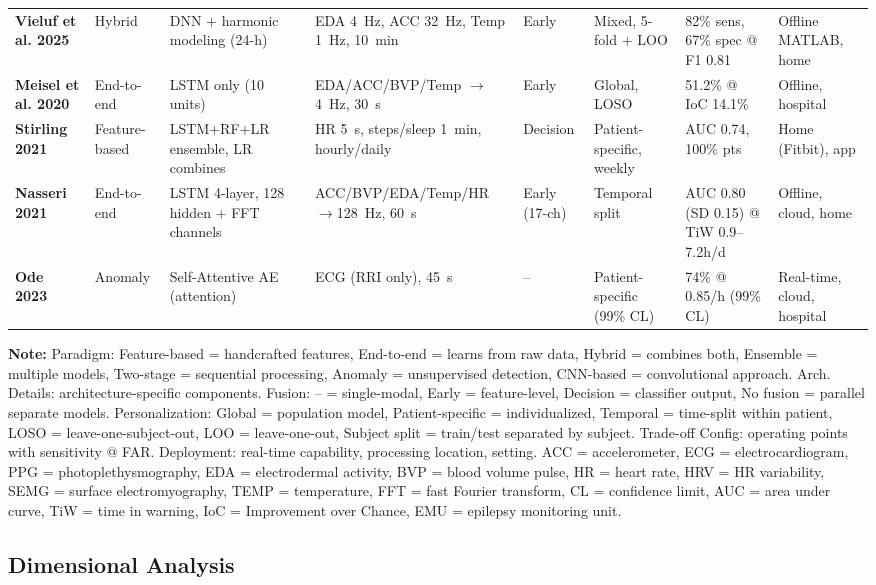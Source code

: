 \begin{landscape}
\begin{table}[htbp]
{\begin{tabular}{@{} l >{\raggedright}p{1.8cm} >{\raggedright}p{2.2cm} >{\raggedright}p{2.0cm} >{\centering}p{1.2cm} >{\raggedright}p{1.8cm} >{\raggedright}p{2.0cm} >{\raggedright}p{1.8cm} @{}}
\textbf{Vieluf et al. 2025} & Hybrid & DNN + harmonic modeling (24-h) & EDA 4~Hz, ACC 32~Hz, Temp 1~Hz, 10~min & Early & Mixed, 5-fold + LOO & 82\% sens, 67\% spec @ F1 0.81 & Offline MATLAB, home \\
\textbf{Meisel et al. 2020} & End-to-end & LSTM only (10 units) & EDA/ACC/BVP/Temp $\to$4~Hz, 30~s & Early & Global, LOSO & 51.2\% @ IoC 14.1\% & Offline, hospital \\
\textbf{Stirling 2021} & Feature-based & LSTM+RF+LR ensemble, LR combines & HR 5~s, steps/sleep 1~min, hourly/daily & Decision & Patient-specific, weekly & AUC 0.74, 100\% pts & Home (Fitbit), app \\
\textbf{Nasseri 2021} & End-to-end & LSTM 4-layer, 128 hidden + FFT channels & ACC/BVP/EDA/Temp/HR $\to$128~Hz, 60~s & Early (17-ch) & Temporal split & AUC 0.80 (SD 0.15) @ TiW 0.9--7.2h/d & Offline, cloud, home \\
\textbf{Ode 2023} & Anomaly & Self-Attentive AE (attention) & ECG (RRI only), 45~s & -- & Patient-specific (99\% CL) & 74\% @ 0.85/h (99\% CL) & Real-time, cloud, hospital \\
\bottomrule
\end{tabular}%
}
\par\medskip
\footnotesize
\textbf{Note:} Paradigm: Feature-based = handcrafted features, End-to-end = learns from raw data, Hybrid = combines both, Ensemble = multiple models, Two-stage = sequential processing, Anomaly = unsupervised detection, CNN-based = convolutional approach. Arch. Details: architecture-specific components. Fusion: -- = single-modal, Early = feature-level, Decision = classifier output, No fusion = parallel separate models. Personalization: Global = population model, Patient-specific = individualized, Temporal = time-split within patient, LOSO = leave-one-subject-out, LOO = leave-one-out, Subject split = train/test separated by subject. Trade-off Config: operating points with sensitivity @ FAR. Deployment: real-time capability, processing location, setting. ACC = accelerometer, ECG = electrocardiogram, PPG = photoplethysmography, EDA = electrodermal activity, BVP = blood volume pulse, HR = heart rate, HRV = HR variability, SEMG = surface electromyography, TEMP = temperature, FFT = fast Fourier transform, CL = confidence limit, AUC = area under curve, TiW = time in warning, IoC = Improvement over Chance, EMU = epilepsy monitoring unit.
\end{table}
\end{landscape}

\subsection{Dimensional Analysis}

